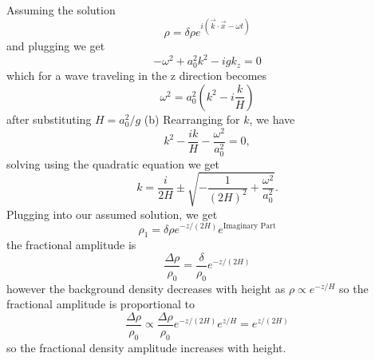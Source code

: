 \documentclass[11pt]{article}
\begin{document}
Assuming the solution
\begin{equation}
 \rho = \delta \rho e^{i (\vec{k} \cdot \vec{x} - \omega t)}
\end{equation}
and plugging we get
\begin{equation}
 - \omega^2 + a_0^2 k^2 - i g k_z = 0
\end{equation}
which for a wave traveling in the z direction becomes
\begin{equation}
 \omega^2 = a_0^2 \left (k^2 - i \frac{k}{H} \right )
\end{equation}
after substituting \(H = a_0^2 / g\)
(b) Rearranging for \(k\), we have
\begin{equation}
 k^2 - \frac{i k}{H} - \frac{\omega^2}{a_0^2} = 0,
\end{equation}
solving using the quadratic equation we get
\begin{equation}
 k = \frac{i}{2H} \pm \sqrt{-\frac{1}{(2H)^2} + \frac{\omega^2}{a_0^2}}.
\end{equation}
Plugging into our assumed solution, we get
\begin{equation}
 \rho_1 = \delta \rho e^{-z/(2H)} e^{\text{Imaginary Part}}
\end{equation}
the fractional amplitude is
\begin{equation}
 \frac{\Delta \rho}{\rho_0} = \frac{\delta}{\rho_0} e^{-z / (2H)}
\end{equation}
however the background density decreases with height as \(\rho \propto e^{-z/H}\) so the fractional amplitude is proportional to
\begin{equation}
 \frac{\Delta \rho}{\rho_0} \propto \frac{\Delta \rho}{\rho_0} e^{-z / (2H)} e^{z/H} = e^{z/(2H)}
\end{equation}
so the fractional density amplitude increases with height.
\end{document}
